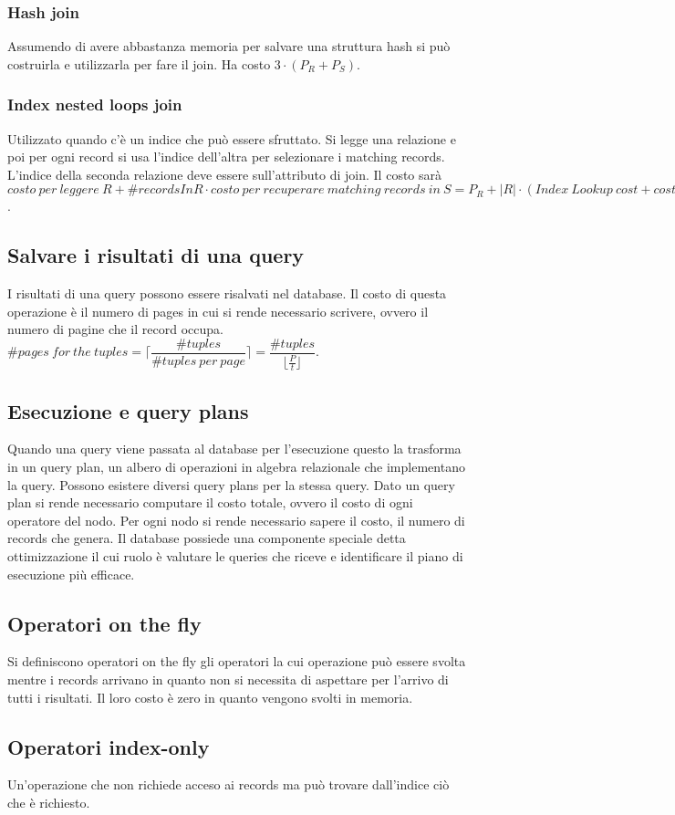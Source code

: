 \subsubsection{Hash join}
Assumendo di avere abbastanza memoria per salvare una struttura hash si pu\`o costruirla e utilizzarla per fare il join. Ha costo $3\cdot(P_R+P_S)$. 
\subsubsection{Index nested loops join}
Utilizzato quando c'\`e un indice che pu\`o essere sfruttato. Si legge una relazione e poi per ogni record si usa l'indice dell'altra per selezionare i matching records. L'indice della seconda relazione deve essere
sull'attributo di join. Il costo sar\`a $costo\ per\ leggere\ R+\# recordsInR\cdot costo\ per\ recuperare\ matching\ records\ in\ S=P_R+|R|\cdot(Index\ Lookup\ cost+cost\ of\ retrieving\ qualifying\ records)$. 
\subsection{Salvare i risultati di una query}
I risultati di una query possono essere risalvati nel database. Il costo di questa operazione \`e il numero di pages in cui si rende necessario scrivere, ovvero il numero di pagine che il record occupa. 
$\# pages\ for\ the\ tuples=\lceil\dfrac{\# tuples}{\# tuples\ per\ page}\rceil=\dfrac{\# tuples}{\lfloor\frac{P}{t}\rfloor}$. 
\subsection{Esecuzione e  query plans}
Quando una query viene passata al database per l'esecuzione questo la trasforma in un query plan, un albero di operazioni in algebra relazionale che implementano la query. Possono esistere diversi query plans
per la stessa query. Dato un query plan si rende necessario computare il costo totale, ovvero il costo di ogni operatore del nodo. Per ogni nodo si rende necessario sapere il costo, il numero di records che genera. 
Il database possiede una componente speciale detta ottimizzazione il cui ruolo \`e valutare le queries che riceve e identificare il piano di esecuzione pi\`u efficace. 
\subsection{Operatori on the fly}
Si definiscono operatori on the fly gli operatori la cui operazione pu\`o essere svolta mentre i records arrivano in quanto non si necessita di aspettare per l'arrivo di tutti i risultati. Il loro costo \`e zero in quanto
vengono svolti in memoria. 
\subsection{Operatori index-only}
Un'operazione che non richiede acceso ai records ma pu\`o trovare dall'indice ci\`o che \`e richiesto.
